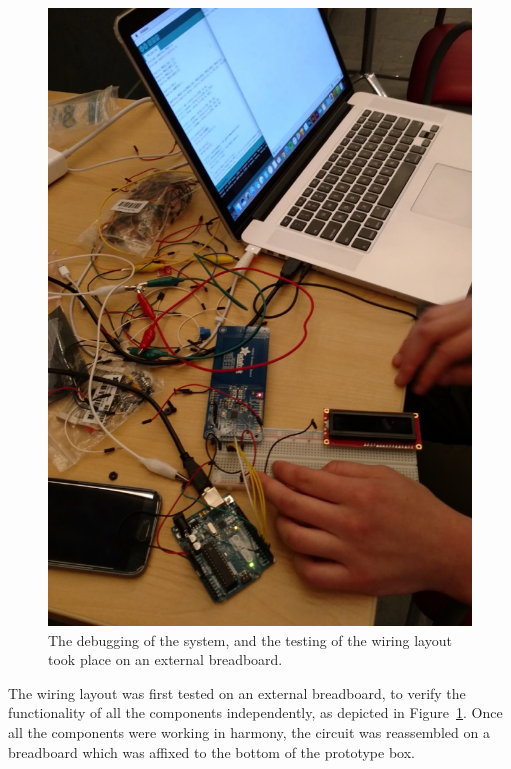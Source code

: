 \documentclass{sigchi}
\begin{document}
\begin{figure}[!ht]
\centering
\includegraphics[width=\columnwidth]{debug}
\caption{The debugging of the system, and the testing of the wiring layout took
	place on an external breadboard.}
\label{fig:debug}
\end{figure}

The wiring layout was first tested on an external breadboard, to verify the
functionality of all the components independently, as depicted in Figure~\ref{fig:debug}.
Once all the components were working in harmony, the circuit was reassembled on a
breadboard which was affixed to the bottom of the prototype box.
\end{document}
